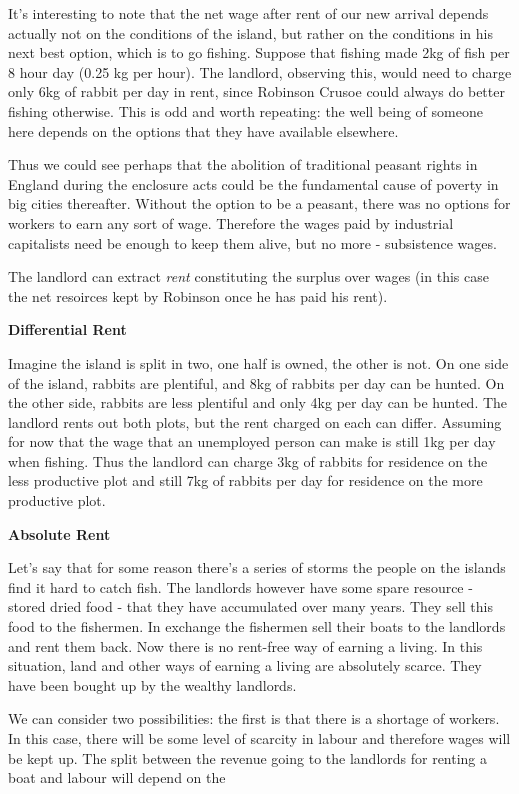 \documentclass[]{tufte-handout}
\begin{document}
It's interesting to note that the net wage after rent of our new arrival
depends actually not on the conditions of the island, but rather on the
conditions in his next best option, which is to go fishing. Suppose that
fishing made 2kg of fish per 8 hour day (0.25 kg per hour). The
landlord, observing this, would need to charge only 6kg of rabbit per
day in rent, since Robinson Crusoe could always do better fishing
otherwise. This is odd and worth repeating: the well being of someone
here depends on the options that they have available elsewhere.

Thus we could see perhaps that the abolition of traditional peasant
rights in England during the enclosure acts could be the fundamental
cause of poverty in big cities thereafter. Without the option to be a
peasant, there was no options for workers to earn any sort of wage.
Therefore the wages paid by industrial capitalists need be enough to
keep them alive, but no more - subsistence wages.

The landlord can extract \emph{rent} constituting the surplus over wages
(in this case the net resoirces kept by Robinson once he has paid his
rent).

\textbf{Differential Rent}

Imagine the island is split in two, one half is owned, the other is not.
On one side of the island, rabbits are plentiful, and 8kg of rabbits per
day can be hunted. On the other side, rabbits are less plentiful and
only 4kg per day can be hunted. The landlord rents out both plots, but
the rent charged on each can differ. Assuming for now that the wage that
an unemployed person can make is still 1kg per day when fishing. Thus
the landlord can charge 3kg of rabbits for residence on the less
productive plot and still 7kg of rabbits per day for residence on the
more productive plot.

\textbf{Absolute Rent}

Let's say that for some reason there's a series of storms the people on
the islands find it hard to catch fish. The landlords however have some
spare resource - stored dried food - that they have accumulated over
many years. They sell this food to the fishermen. In exchange the
fishermen sell their boats to the landlords and rent them back. Now
there is no rent-free way of earning a living. In this situation, land
and other ways of earning a living are absolutely scarce. They have been
bought up by the wealthy landlords.

We can consider two possibilities: the first is that there is a shortage
of workers. In this case, there will be some level of scarcity in labour
and therefore wages will be kept up. The split between the revenue going
to the landlords for renting a boat and labour will depend on the
\end{document}
